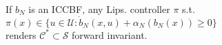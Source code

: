 \documentclass[preview]{standalone}
\begin{document}
\begin{center}
If $b_N$ is an ICCBF, any Lips. controller $\pi$ s.t.\\$\pi(x) \in \{ u \in \mathcal{U} : \dot b_N(x, u) + \alpha_N(b_N(x)) \geq 0 \}$\\renders $\mathcal{C}^* \subset \mathcal{S}$ forward invariant.
\end{center}
\end{document}
